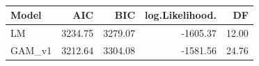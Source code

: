 \documentclass[border=1mm]{standalone}
\begin{document}
\begingroup\fontsize{12}{14}\selectfont

\begin{longtable}[t]{lrrrr}
\caption{\label{tab:unnamed-chunk-23}}\\
\toprule
Model & AIC & BIC & log.Likelihood. & DF\\
\midrule
LM & 3234.75 & 3279.07 & -1605.37 & 12.00\\
GAM\_v1 & 3212.64 & 3304.08 & -1581.56 & 24.76\\
\bottomrule
\end{longtable}
\endgroup{}
\end{document}

